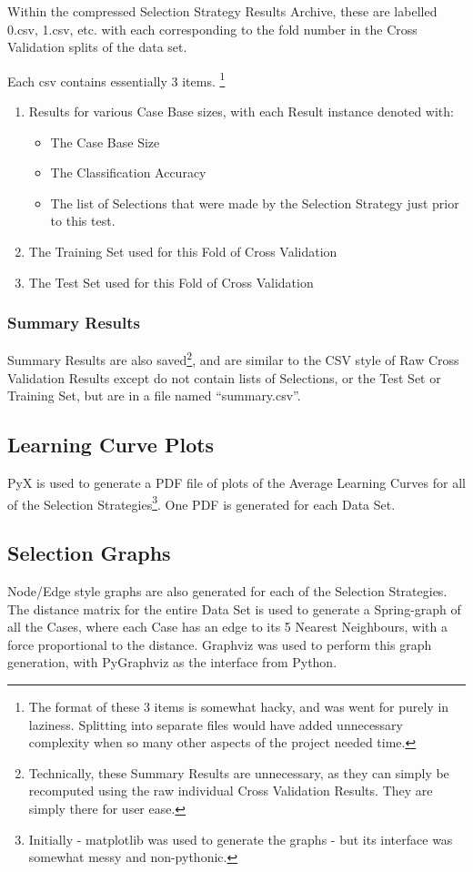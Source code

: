 \documentclass[a4paper,11pt]{report}
\begin{document}
Within the compressed Selection Strategy Results Archive, these are labelled 0.csv, 1.csv, etc. with each corresponding to the fold number in the Cross Validation splits of the data set.

Each csv contains essentially 3 items. \footnote{The format of these 3 items is somewhat hacky, and was went for purely in laziness. Splitting into separate files would have added unnecessary complexity when so many other aspects of the project needed time.}

\begin{enumerate}
	\item Results for various Case Base sizes, with each Result instance denoted with:
		\begin{itemize}
			\item The Case Base Size
			\item The Classification Accuracy
			\item The list of Selections that were made by the Selection Strategy just prior to this test.
		\end{itemize}
	\item The Training Set used for this Fold of Cross Validation
	\item The Test Set used for this Fold of Cross Validation
\end{enumerate}

\subsubsection{Summary Results}
Summary Results are also saved\footnote{Technically, these Summary Results are unnecessary, as they can simply be recomputed using the raw individual Cross Validation Results. They are simply there for user ease.}, and are similar to the CSV style of Raw Cross Validation Results except do not contain lists of Selections, or the Test Set or Training Set, but are in a file named ``summary.csv''.

\subsection{Learning Curve Plots}
PyX\cite{prog:pyx} is used to generate a PDF file of plots of the Average Learning Curves for all of the Selection Strategies\footnote{Initially - matplotlib\cite{prog:matplotlib} was used to generate the graphs - but its interface was somewhat messy and non-pythonic.}. One PDF is generated for each Data Set.

\subsection{Selection Graphs}
Node/Edge style graphs are also generated for each of the Selection Strategies. The distance matrix for the entire Data Set is used to generate a Spring-graph of all the Cases, where each Case has an edge to its 5 Nearest Neighbours, with a force proportional to the distance. Graphviz\cite{prog:graphviz} was used to perform this graph generation, with PyGraphviz\cite{prog:pygraphviz} as the interface from Python.
\end{document}
